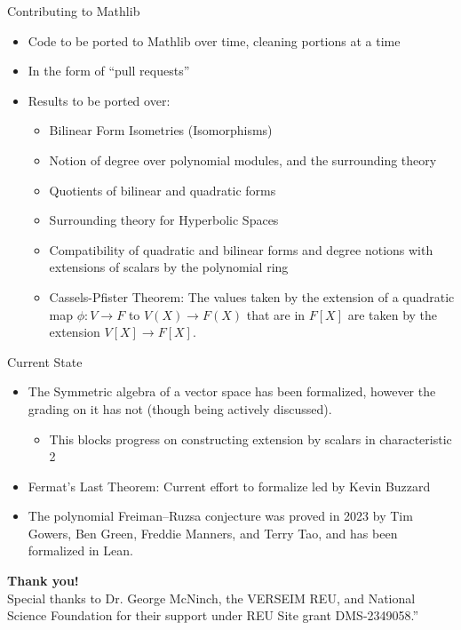 \documentclass[svgnames]{beamer}
\begin{document}
\begin{frame}{Contributing to Mathlib}
\begin{itemize}[<+->]
    \item Code to be ported to Mathlib over time, cleaning portions at a time
    \item In the form of ``pull requests''
    \item Results to be ported over: 
    \begin{itemize}[<+->]
        \item Bilinear Form Isometries (Isomorphisms)
        \item Notion of degree over polynomial modules, and the surrounding theory
        \item Quotients of bilinear and quadratic forms
        \item Surrounding theory for Hyperbolic Spaces
        \item Compatibility of quadratic and bilinear forms and degree notions with extensions of scalars by the polynomial ring
        \item Cassels-Pfister Theorem: The values taken by the extension of a quadratic map $\phi: V \to F$ to $V(X) \to F(X)$ that are in $F[X]$ are taken by the extension $V[X] \to F[X]$. 
    \end{itemize}
\end{itemize}
\end{frame}

\begin{frame}{Current State}
\begin{itemize}[<+->]
    \item The Symmetric algebra of a vector space has been formalized, however the grading on it has not (though being actively discussed). 
    \begin{itemize}[<+->]
        \item This blocks progress on constructing extension by scalars in characteristic 2
    \end{itemize}
    \item Fermat's Last Theorem: Current effort to formalize led by Kevin Buzzard
    \item The polynomial Freiman–Ruzsa conjecture was proved in 2023 by Tim Gowers, Ben Green, Freddie Manners, and Terry Tao, and has been formalized in Lean. 
\end{itemize}
\end{frame}

\begin{frame}
	    \begin{center}
	        \textbf{Thank you!}\\
	        
	        Special thanks to Dr. George McNinch, the VERSEIM REU, and National Science Foundation for their support under REU Site grant DMS-2349058.”
         \bigbreak
         \LARGE
       
	    \end{center}
\end{frame}
\end{document}
